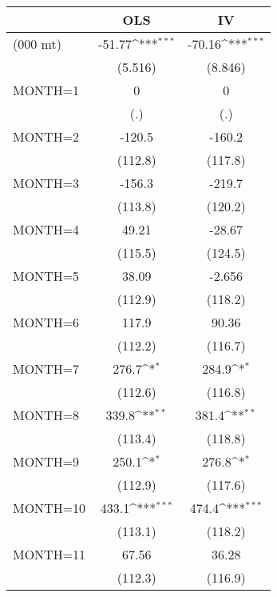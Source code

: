 {
\def\sym#1{\ifmmode^{#1}\else\(^{#1}\)\fi}
\begin{tabular}{l*{2}{c}}
\hline\hline
                &      OLS         &       IV         \\
\hline
(000 mt)        &   -51.77\sym{***}&   -70.16\sym{***}\\
                &  (5.516)         &  (8.846)         \\
[1em]
MONTH=1         &        0         &        0         \\
                &      (.)         &      (.)         \\
[1em]
MONTH=2         &   -120.5         &   -160.2         \\
                &  (112.8)         &  (117.8)         \\
[1em]
MONTH=3         &   -156.3         &   -219.7         \\
                &  (113.8)         &  (120.2)         \\
[1em]
MONTH=4         &    49.21         &   -28.67         \\
                &  (115.5)         &  (124.5)         \\
[1em]
MONTH=5         &    38.09         &   -2.656         \\
                &  (112.9)         &  (118.2)         \\
[1em]
MONTH=6         &    117.9         &    90.36         \\
                &  (112.2)         &  (116.7)         \\
[1em]
MONTH=7         &    276.7\sym{*}  &    284.9\sym{*}  \\
                &  (112.6)         &  (116.8)         \\
[1em]
MONTH=8         &    339.8\sym{**} &    381.4\sym{**} \\
                &  (113.4)         &  (118.8)         \\
[1em]
MONTH=9         &    250.1\sym{*}  &    276.8\sym{*}  \\
                &  (112.9)         &  (117.6)         \\
[1em]
MONTH=10        &    433.1\sym{***}&    474.4\sym{***}\\
                &  (113.1)         &  (118.2)         \\
[1em]
MONTH=11        &    67.56         &    36.28         \\
                &  (112.3)         &  (116.9)         \\

\end{tabular}}
